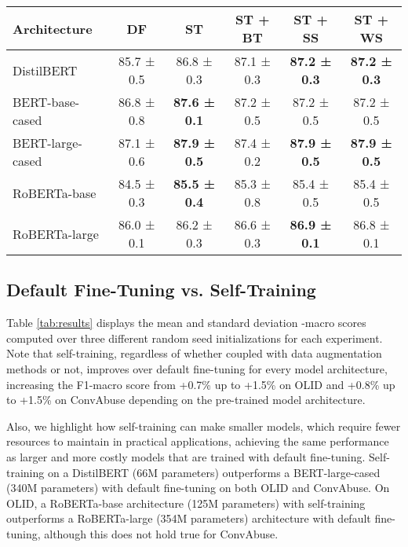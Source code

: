 \documentclass[11pt,a4paper]{article}
\begin{document}
\begin{table*}
\begin{tabular}{@{}lccccc@{}}
Architecture     & DF         & ST                  & ST + BT     & ST + SS             & ST + WS             \\ \midrule
DistilBERT  & 85.7\footnotesize{ ± 0.5} & 86.8\footnotesize{ ± 0.3}          & 87.1\footnotesize{ ± 0.3}  & \textbf{87.2\footnotesize{ ± 0.3}} & \textbf{87.2\footnotesize{ ± 0.3}} \\
BERT-base-cased  & 86.8\footnotesize{ ± 0.8} & \textbf{87.6\footnotesize{ ± 0.1}} & 87.2\footnotesize{ ± 0.5}  & 87.2\footnotesize{ ± 0.5}          & 87.2\footnotesize{ ± 0.5}          \\
BERT-large-cased & 87.1\footnotesize{ ± 0.6} & \textbf{87.9\footnotesize{ ± 0.5}} & 87.4\footnotesize{ ± 0.2}  & \textbf{87.9\footnotesize{ ± 0.5}} & \textbf{87.9\footnotesize{ ± 0.5}} \\
RoBERTa-base     & 84.5\footnotesize{ ± 0.3} & \textbf{85.5\footnotesize{ ± 0.4}} & 85.3\footnotesize{ ± 0.8}  & 85.4\footnotesize{ ± 0.5}          & 85.4\footnotesize{ ± 0.5}          \\
RoBERTa-large    & 86.0\footnotesize{ ± 0.1} & 86.2\footnotesize{ ± 0.3}          & 86.6\footnotesize{ ± 0.3} & \textbf{86.9\footnotesize{ ± 0.1}} & 86.8\footnotesize{ ± 0.1}         \\ \bottomrule
\end{tabular}
\caption{Mean ± 1 std F1-Macro scores obtained over three random seed initializations.\\ \centering DF=Default Fine-Tuning, ST=Self-Training, BT=Backtranslation, SS=Synonym Substitution, WS=Word Swap}
\label{tab:results}
\end{table*}

\subsection{Default Fine-Tuning vs. Self-Training} \label{sec:dfvsst}
Table \ref{tab:results} displays the mean and standard deviation -macro scores computed over three different random seed initializations for each experiment. Note that self-training, regardless of whether coupled with data augmentation methods or not, improves over default fine-tuning for every model architecture, increasing the F1-macro score from +0.7\% up to +1.5\% on OLID and +0.8\% up to +1.5\% on ConvAbuse depending on the pre-trained model architecture.

Also, we highlight how self-training can make smaller models, which require fewer resources to maintain in practical applications, achieving the same performance as larger and more costly models that are trained with default fine-tuning. Self-training on a DistilBERT (66M parameters) outperforms a BERT-large-cased (340M parameters) with default fine-tuning on both OLID and ConvAbuse. On OLID, a RoBERTa-base architecture (125M parameters) with self-training outperforms a RoBERTa-large (354M parameters) architecture with default fine-tuning, although this does not hold true for ConvAbuse.
\end{document}
